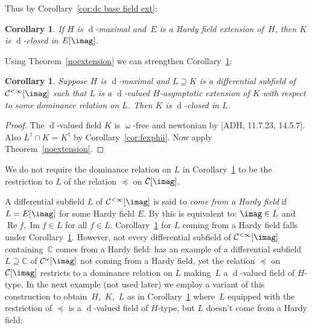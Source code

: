 \documentclass[]{amsart}
\numberwithin{equation}{section}
\newcommand{\bbold}{\mathbb}
\def\C { {\bbold C} }
\def\c {\mathcal{C}}
\def \d{\operatorname{d}}
\renewcommand{\Re}{\operatorname{Re}}
\renewcommand{\Im}{\operatorname{Im}}
\newtheorem{cor}[theorem]{Corollary}
\theoremstyle{definition}
\theoremstyle{remark}
\renewcommand\preceq{\preccurlyeq}
\def \upo{\upomega}
\def \Gom{\mathcal{C}^{\omega}}
\def \Calinf{\mathcal{C}^{<\infty}}
\begin{document}
\noindent
Thus by Corollary~\ref{cor:dc base field ext}:

\begin{cor}\label{cor:d-max weakly d-closed}
If $H$ is $\d$-maximal and~$E$ is a Hardy field extension of~$H$, then
$K$ is $\d$-closed in $E[\imag]$.
\end{cor}

\noindent
Using Theorem~\ref{noextension} we can strengthen  Corollary~\ref{cor:d-max weakly d-closed}:

\begin{cor}\label{dmaxdom} Suppose $H$ is $\d$-maximal and $L\supseteq K$ is a differential subfield of~$\Calinf[\imag]$  such that $L$ is a $\d$-valued $H$-asymptotic extension of $K$ with respect to some dominance relation on $L$. 
Then $K$ is $\d$-closed in $L$. 
\end{cor}
\begin{proof}  The $\d$-valued field $K$ is $\upo$-free and newtonian by [ADH, 11.7.23, 14.5.7]. Also $L^\dagger\cap K=K^\dagger$ by Corollary~\ref{cor:fexphii}. Now apply Theorem~\ref{noextension}.
\end{proof} 

\noindent
We do not require  the dominance relation on $L$ in Corollary~\ref{dmaxdom} to be the restriction to $L$ of the relation $\preceq$ on $\c[\imag]$.  

A differential subfield $L$ of $\Calinf[\imag]$ is said to {\it come from a Hardy field}\/ if~${L=E[\imag]}$ for some Hardy field $E$. 
By \cite[Section~2]{ADH5} this is equivalent to: $\imag \in L$ and $\Re f,\Im f\in L$ for all $f\in L$. Corollary~\ref{dmaxdom} for $L$ coming from a Hardy field
falls under Corollary~\ref{cor:d-max weakly d-closed}. However, not every differential subfield of $\Calinf[\imag]$ containing~$\C$ comes from a Hardy field:
 \cite[Section~5]{ADH5} has
an example of a differential subfield~${L\supseteq \C}$ of $\Gom[\imag]$ not coming from a Hardy field, yet  the relation  $\preceq$ on $\c[\imag]$    restricts to a dominance relation on $L$
making~$L$ a $\d$-valued field of $H$-type. In the next example (not used later) we employ a variant of this construction 
to obtain~$H$,~$K$,~$L$ as in Corollary~\ref{dmaxdom} where~$L$
equipped with the restriction of $\preceq$ is
a $\d$-valued field of $H$-type, but  $L$ doesn't come from a Hardy field:
\end{document}
